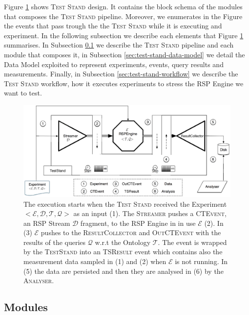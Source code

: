 Figure \ref{fig:architecture} shows \name \textsc{Test Stand} design. It contains the block schema of the modules that composes the \textsc{Test Stand} pipeline. Moreover, we enumerates in the Figure the events that pass trough the the \textsc{Test Stand} while it is executing and experiment. In the following subsection we describe each elements that Figure \ref{fig:architecture} summarises. In Subsection \ref{sec:modules} we describe the \textsc{Test Stand} pipeline and each module that composes it, in Subsection \ref{sec:test-stand-data-model} we detail the Data Model exploited to represent experiments, events, query results and measurements. Finally, in Subsection \ref{sec:test-stand-workflow} we describe the \textsc{Test Stand} workflow, how it executes experiments to stress the RSP Engine we want to test.

\begin{figure}[tbh]
\centering
\includegraphics[scale=0.37]{images/heaven-schema-workflow}
\caption[\name Modules and Workflow]{The execution starts when the \textsc{Test Stand} received the Experiment $<\mathcal{E},\mathcal{D},\mathcal{T},\mathcal{Q}>$ as an input (1). The \textsc{Streamer} pushes a \textsc{CTEvent}, an RSP Stream $\mathcal{D}$ fragment, to the RSP Engine in in use $\mathcal{E}$ (2). In (3) $\mathcal{E}$ pushes to the \textsc{ResultCollector} and \textsc{OutCTEvent} with the results of the queries $\mathcal{Q}$ w.r.t the Ontology $\mathcal{T}$. The event is wrapped by the \textsc{TestStand} into an \textsc{TSResult} event which contains also the measurement data sampled in (1) and (2) when $\mathcal{E}$ is not running. In (5) the data are persisted and then they are analysed in (6) by the \textsc{Analyser}.}
\label{fig:architecture}
\end{figure}


\subsection{Modules}\label{sec:modules}

